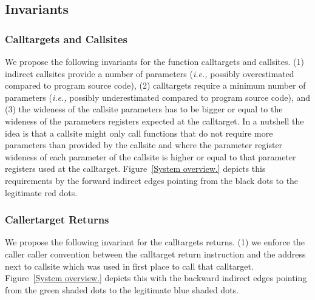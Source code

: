 \subsection{Invariants}
\label{Invariants for Targets and Callsites}

\subsubsection{Calltargets and Callsites}
We propose the following invariants for the function calltargets and callsites.
(1) indirect callsites provide a number of parameters (\textit{i.e.,} possibly overestimated compared to program source code), 
(2) calltargets require a minimum number of parameters (\textit{i.e.,} possibly underestimated compared to program source code), and
(3) the wideness of the callsite parameters has to be bigger or equal to the wideness of the parameters registers expected at the calltarget.
In a nutshell the idea is that a callsite might only call functions that do not require more parameters than provided by the callsite and
where the parameter register wideness of each parameter of the callsite is higher or equal to that parameter registers used at the calltarget.
Figure~\ref{System overview.} depicts this requirements by the forward indirect edges pointing from the black dots to the legitimate
red dots.

\subsubsection{Callertarget Returns}
We propose the following invariant for the calltargets returns.
(1) we enforce the caller caller convention between the calltarget return instruction and the address next 
to callsite which was used in first place to call that calltarget.
Figure~\ref{System overview.} depicts this with the backward indirect edges pointing from the green shaded dots to the legitimate
blue shaded dots.

